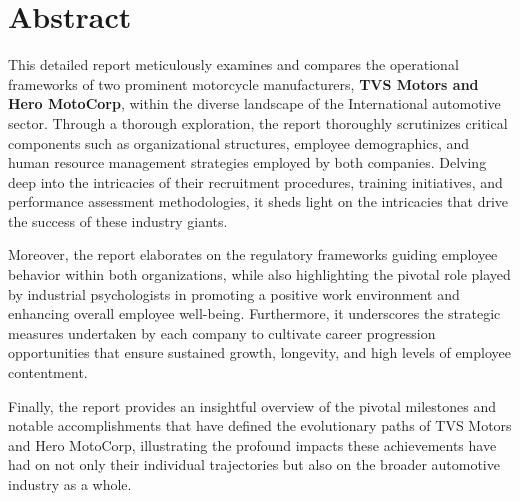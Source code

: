 \setcounter{page}{1}

\section{Abstract}

This detailed report meticulously examines and compares the operational frameworks of two prominent motorcycle manufacturers, \textbf{TVS Motors and Hero MotoCorp}, within the diverse landscape of the International automotive sector. Through a thorough exploration, the report thoroughly scrutinizes critical components such as organizational structures, employee demographics, and human resource management strategies employed by both companies. Delving deep into the intricacies of their recruitment procedures, training initiatives, and performance assessment methodologies, it sheds light on the intricacies that drive the success of these industry giants.

Moreover, the report elaborates on the regulatory frameworks guiding employee behavior within both organizations, while also highlighting the pivotal role played by industrial psychologists in promoting a positive work environment and enhancing overall employee well-being. Furthermore, it underscores the strategic measures undertaken by each company to cultivate career progression opportunities that ensure sustained growth, longevity, and high levels of employee contentment.

Finally, the report provides an insightful overview of the pivotal milestones and notable accomplishments that have defined the evolutionary paths of TVS Motors and Hero MotoCorp, illustrating the profound impacts these achievements have had on not only their individual trajectories but also on the broader automotive industry as a whole.